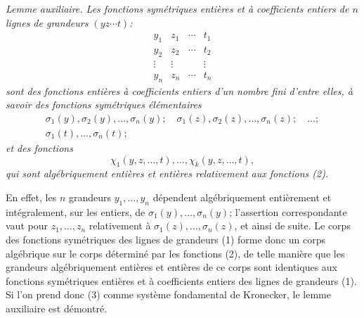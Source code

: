 \emph{Lemme auxiliaire. Les fonctions symétriques entières et à coefficients entiers de $n$ lignes de grandeurs $(yz\cdots t)$:}
\begin{equation}
\begin{array}{cccc}
  y_1&z_1&\cdots&t_1\\
  y_2&z_2&\cdots&t_2\\
  \vdots&\vdots&&\vdots\\
  y_n&z_n&\cdots&t_n
\end{array}
\tag{1}
\end{equation}
\emph{sont des fonctions entières à coefficients entiers d'un nombre fini d'entre elles, à savoir des fonctions symétriques élémentaires}
\begin{equation}
\begin{gathered}
  \sigma_1(y),\sigma_2(y),\ldots,\sigma_n(y);\quad
  \sigma_1(z),\sigma_2(z),\ldots,\sigma_n(z);\quad\ldots;\\
  \sigma_1(t),\ldots,\sigma_n(t);
\end{gathered}
\tag{2}
\end{equation}
\emph{et des fonctions}
\begin{equation}
  \chi_1(y,z,\ldots,t),\ldots,\chi_k(y,z,\ldots,t),
\tag{3}
\end{equation}
\emph{qui sont algébriquement entières et entières relativement aux fonctions (2).}

En effet, les $n$ grandeurs $y_1,\ldots,y_n$ dépendent algébriquement entièrement et intégralement, sur les entiers, de $\sigma_1(y),\ldots,\sigma_n(y)$; l'assertion correspondante vaut pour $z_1,\ldots,z_n$ relativement à $\sigma_1(z),\ldots,\sigma_n(z)$, et ainsi de suite. Le corps des fonctions symétriques des lignes de grandeurs (1) forme donc un corps algébrique sur le corps déterminé par les fonctions (2), de telle manière que les grandeurs algébriquement entières et entières de ce corps sont identiques aux fonctions symétriques entières et à coefficients entiers des lignes de grandeurs (1). Si l'on prend donc (3) comme système fondamental de Kronecker, le lemme auxiliaire est démontré.

